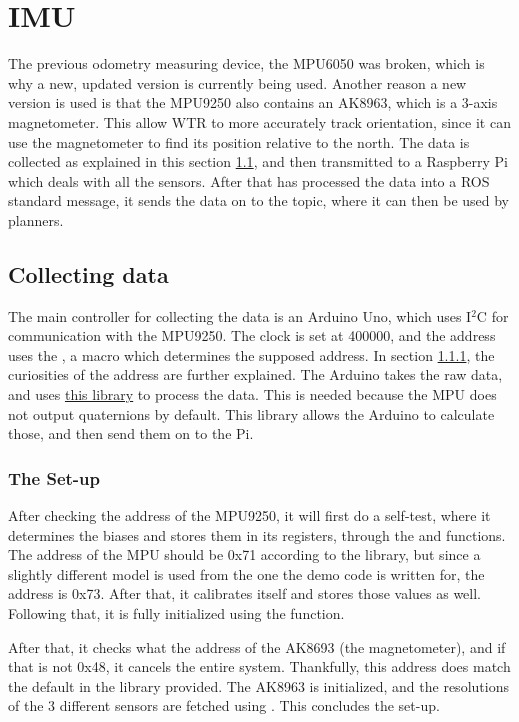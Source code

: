 \section{IMU}
The previous odometry measuring device, the MPU6050 \cite{MPU6050} was broken, which is why a new, updated version is currently being used.
Another reason a new version is used is that the MPU9250 \cite{MPU9250} also contains an AK8963, which is a 3-axis magnetometer.
This allow WTR to more accurately track orientation, since it can use the magnetometer to find its position relative to the north.
The data is collected as explained in this section \ref{sec::collect}, and then transmitted to a Raspberry Pi which deals with all the sensors.
After that has processed the data into a ROS standard message, it sends the data on to the topic, where it can then be used by planners.

\subsection{Collecting data} \label{sec::collect}
The main controller for collecting the data is an Arduino Uno, which uses I$^{2}$C for communication with the MPU9250.
The clock is set at 400000, and the address uses the , a macro which determines the supposed address.
In section \ref{sec::set-up}, the curiosities of the address are further explained.
The Arduino takes the raw data, and uses \href{https://github.com/sparkfun/SparkFun_MPU-9250_Breakout_Arduino_Library}{this library} to process the data.
This is needed because the MPU does not output quaternions by default.
This library allows the Arduino to calculate those, and then send them on to the Pi.


\subsubsection{The Set-up} \label{sec::set-up}
After checking the address of the MPU9250, it will first do a self-test, where it determines the biases and stores them in its registers, through the  and  functions.
The address of the MPU should be 0x71 according to the library, but since a slightly different model is used from the one the demo code is written for, the address is 0x73.
After that, it calibrates itself and stores those values as well.
Following that, it is fully initialized using the  function.

After that, it checks what the address of the AK8693 (the magnetometer), and if that is not 0x48, it cancels the entire system.
Thankfully, this address does match the default in the library provided.
The AK8963 is initialized, and the resolutions of the 3 different sensors are fetched using .
This concludes the set-up.


